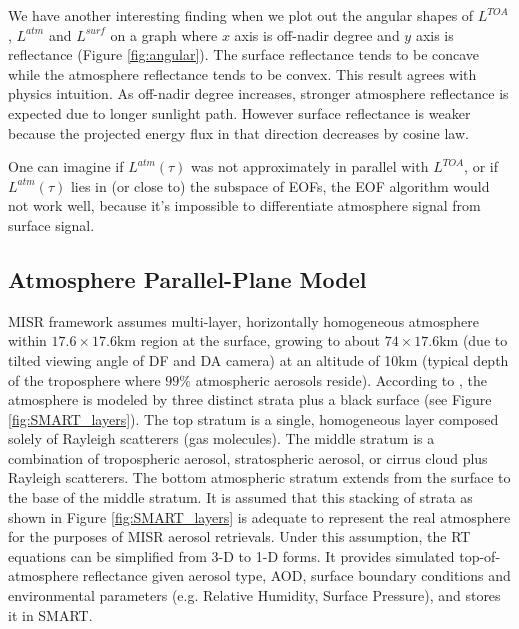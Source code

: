 We have another interesting finding when we plot out the angular shapes of $L^{TOA}$, $L^{atm}$ and $L^{surf}$ on a graph where $x$ axis is off-nadir degree and $y$ axis is reflectance (Figure \ref{fig:angular}). The surface reflectance tends to be concave while the atmosphere reflectance tends to be convex. This result agrees with physics intuition. As off-nadir degree increases, stronger atmosphere reflectance is expected due to longer sunlight path. However surface reflectance is weaker because the projected energy flux in that direction decreases by cosine law.

One can imagine if $L^{atm}(\tau)$ was not approximately in parallel with $L^{TOA}$, or if $L^{atm}(\tau)$ lies in (or close to) the subspace of EOFs, the EOF algorithm would not work well, because it's impossible to differentiate atmosphere signal from surface signal.

\clearpage
\subsection{Atmosphere Parallel-Plane Model}
MISR framework assumes multi-layer, horizontally homogeneous atmosphere within $17.6\times17.6$km region at the surface, growing to about $74\times17.6$km (due to tilted viewing angle of DF and DA camera) at an altitude of 10km (typical depth of the troposphere where $99\%$ atmospheric aerosols reside). According to \cite{misr_ancillary}, the atmosphere is modeled by three distinct strata plus a black surface (see Figure \ref{fig:SMART_layers}). The top stratum is a single, homogeneous layer composed solely of Rayleigh scatterers (gas molecules). The middle stratum is a combination of tropospheric aerosol, stratospheric aerosol, or cirrus cloud plus Rayleigh scatterers. The bottom atmospheric stratum extends from the surface to the base of the middle stratum. It is assumed that this stacking of strata as shown in Figure \ref{fig:SMART_layers} is adequate to represent the real atmosphere for the purposes of MISR aerosol retrievals. Under this assumption, the RT equations can be simplified from 3-D to 1-D forms. It provides simulated top-of-atmosphere reflectance given aerosol type, AOD, surface boundary conditions and environmental parameters (e.g. Relative Humidity, Surface Pressure), and stores it in SMART.

